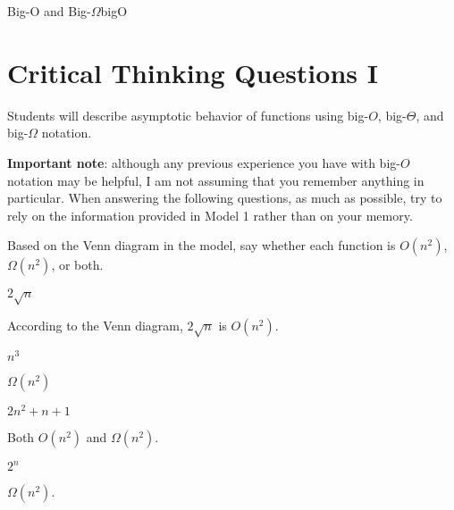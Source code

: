 \documentclass{tufte-handout}
\begin{document}
\begin{model}{Big-O and Big-$\Omega$}{bigO}
\begin{center}
\begin{minipage}{\textwidth}
\end{minipage}

\end{center}
\end{model}

\newpage
\section{Critical Thinking Questions I}
\begin{objective}
  Students will describe asymptotic behavior of functions
  using big-$O$, big-$\Theta$, and big-$\Omega$ notation.
\end{objective}

\textbf{Important note}: although any previous experience you have
with big-$O$ notation may be helpful, I am not assuming that you
remember anything in particular.  When answering the following
questions, as much as possible, try to rely on the information
provided in Model 1 rather than on your memory.

\begin{questions}
\item Based on the Venn diagram in the model, say whether each
  function is $O(n^2)$, $\Omega(n^2)$, or both. 
  \begin{subquestions}
  \item $2\sqrt n$
    \begin{answer}According to the Venn diagram, $2\sqrt n$ is $O(n^2)$.\end{answer}
  \item $n^3$
    \begin{answer}$\Omega(n^2)$\end{answer}
  \item $2n^2 + n + 1$
    \begin{answer}Both $O(n^2)$ and $\Omega(n^2)$.\end{answer}
  \item $2^n$
    \begin{answer}$\Omega(n^2)$.\end{answer}
  \end{subquestions}
\end{questions}
\end{document}
